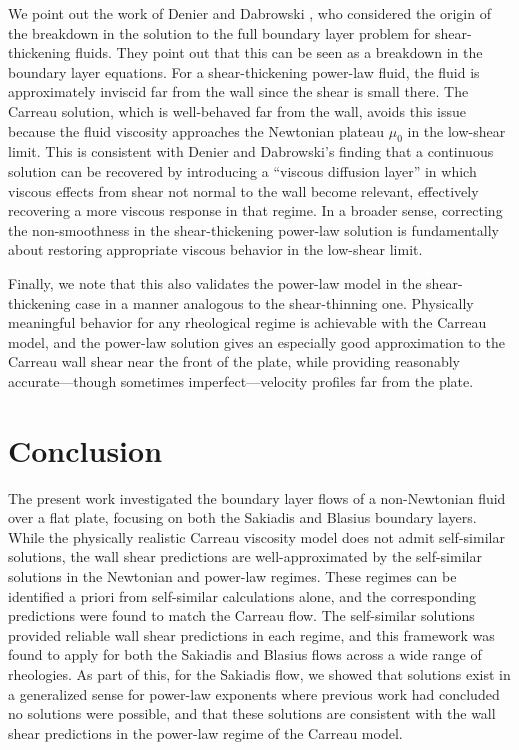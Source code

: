 \documentclass{article}
\begin{document}
We point out the work of Denier and Dabrowski \cite{Dabrowski}, who considered the origin of the breakdown in the solution to the full boundary layer problem for shear-thickening fluids. They point out that this can be seen as a breakdown in the boundary layer equations. For a shear-thickening power-law fluid, the fluid is approximately inviscid far from the wall since the shear is small there. The Carreau solution, which is well-behaved far from the wall, avoids this issue because the fluid viscosity approaches the Newtonian plateau $\mu_0$ in the low-shear limit. This is consistent with Denier and Dabrowski's finding that a continuous solution can be recovered by introducing a ``viscous diffusion layer'' in which viscous effects from shear not normal to the wall become relevant, effectively recovering a more viscous response in that regime. In a broader sense, correcting the non-smoothness in the shear-thickening power-law solution is fundamentally about restoring appropriate viscous behavior in the low-shear limit.

Finally, we note that this also validates the power-law model in the shear-thickening case in a manner analogous to the shear-thinning one. Physically meaningful behavior for any rheological regime is achievable with the Carreau model, and the power-law solution gives an especially good approximation to the Carreau wall shear near the front of the plate, while providing reasonably accurate---though sometimes imperfect---velocity profiles far from the plate.

\section{Conclusion}

The present work investigated the boundary layer flows of a non-Newtonian fluid over a flat plate, focusing on both the Sakiadis and Blasius boundary layers. While the physically realistic Carreau viscosity model does not admit self-similar solutions, the wall shear predictions are well-approximated by the self-similar solutions in the Newtonian and power-law regimes. These regimes can be identified a priori from self-similar calculations alone, and the corresponding predictions were found to match the Carreau flow. The self-similar solutions provided reliable wall shear predictions in each regime, and this framework was found to apply for both the Sakiadis and Blasius flows across a wide range of rheologies. As part of this, for the Sakiadis flow, we showed that solutions exist in a generalized sense for power-law exponents where previous work had concluded no solutions were possible, and that these solutions are consistent with the wall shear predictions in the power-law regime of the Carreau model.


\end{document}
